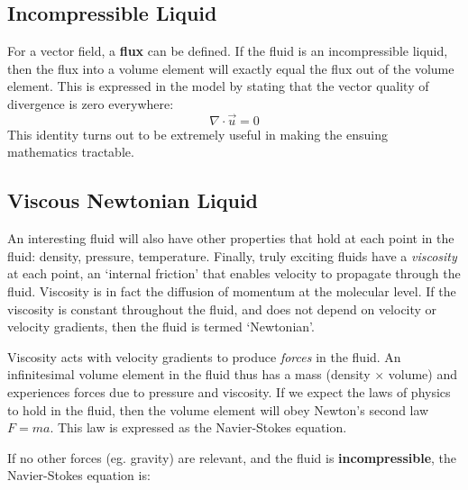 \documentclass[a4paper]{report}
\begin{document}
\begin{center}
\end{center}


\subsection*{Incompressible Liquid}

For a vector field, a \textbf{flux} can be defined.  If the fluid is an incompressible liquid, then the flux into a volume element will exactly equal the flux out of the volume element.  This is expressed in the model by stating that the vector quality of divergence is zero everywhere:
\begin{equation}
\nabla \cdot \vec{u} = 0
\end{equation}
This identity turns out to be extremely useful in making the ensuing mathematics tractable.



\subsection*{Viscous Newtonian Liquid}

An interesting fluid will also have other properties that hold at each point in the fluid: density, pressure, temperature.  Finally, truly exciting fluids have a \emph{viscosity} at each point, an `internal friction' that enables velocity to propagate through the fluid.  Viscosity is in fact the diffusion of momentum at the molecular level.
If the viscosity is constant throughout the fluid, and does not depend on velocity or velocity gradients, then the fluid is termed `Newtonian'. 

Viscosity acts with velocity gradients to produce \emph{forces} in the fluid.  An infinitesimal volume element in the fluid thus has a mass (density $\times$ volume) and experiences forces due to pressure and viscosity.  If we expect the laws of physics to hold in the fluid, then the volume element will obey Newton's second law $F= ma$.  This law is expressed as the Navier-Stokes equation.

If no other forces (eg. gravity) are relevant, and the fluid is \textbf{incompressible}, the Navier-Stokes equation is:
\end{document}
